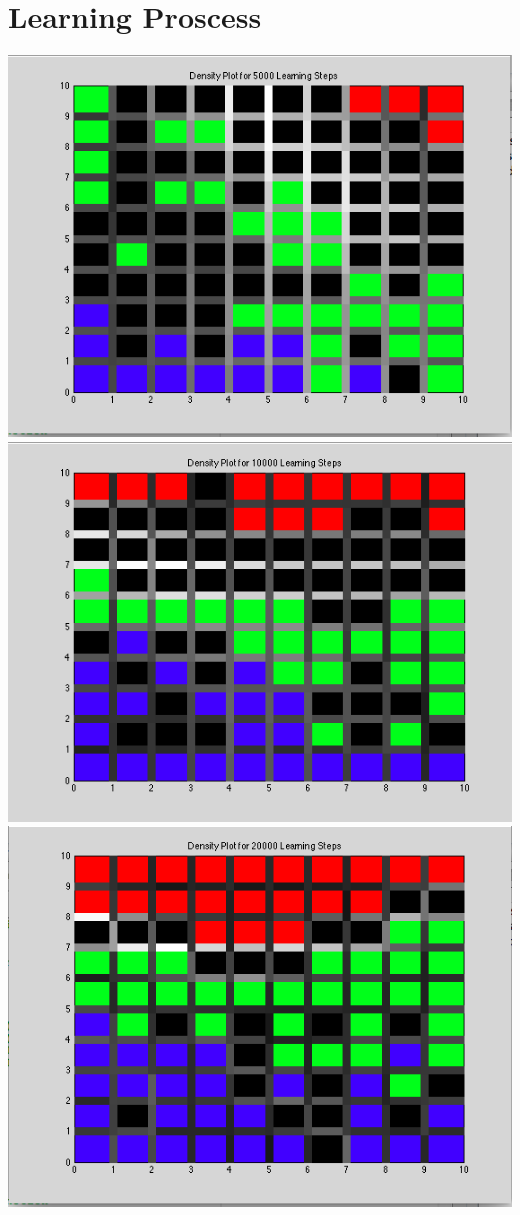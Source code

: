 \documentclass[epsfig]{article}
\begin{document}
\section*{Learning Proscess}
\begin{center}
\includegraphics[scale=0.4]{pic62}
\includegraphics[scale=0.4]{pic63}
\includegraphics[scale=0.4]{pic64}

\end{center}
\end{document}
